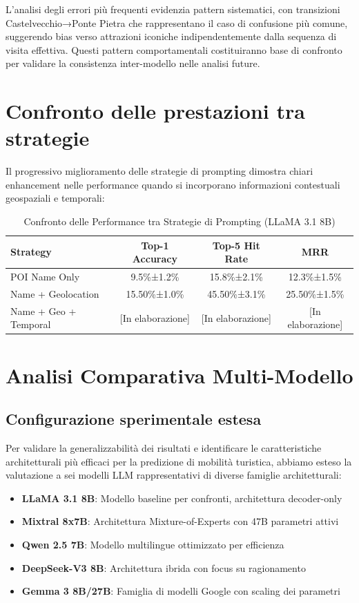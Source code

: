 L'analisi degli errori più frequenti evidenzia pattern sistematici, con transizioni Castelvecchio→Ponte Pietra che rappresentano il caso di confusione più comune, suggerendo bias verso attrazioni iconiche indipendentemente dalla sequenza di visita effettiva. Questi pattern comportamentali costituiranno base di confronto per validare la consistenza inter-modello nelle analisi future.

\section{Confronto delle prestazioni tra strategie}

Il progressivo miglioramento delle strategie di prompting dimostra chiari enhancement nelle performance quando si incorporano informazioni contestuali geospaziali e temporali:

\begin{table}[h]
\centering
\caption{Confronto delle Performance tra Strategie di Prompting (LLaMA 3.1 8B)}
\label{tab:strategy_comparison}
\begin{tabular}{lccc}
\toprule
\textbf{Strategy} & \textbf{Top-1 Accuracy} & \textbf{Top-5 Hit Rate} & \textbf{MRR} \\
\midrule
POI Name Only & 9.5\%±1.2\% & 15.8\%±2.1\% & 12.3\%±1.5\% \\
Name + Geolocation & 15.50\%±1.0\% & 45.50\%±3.1\% & 25.50\%±1.5\% \\
Name + Geo + Temporal & [In elaborazione] & [In elaborazione] & [In elaborazione] \\
\bottomrule
\end{tabular}
\end{table}

\section{Analisi Comparativa Multi-Modello}

\subsection{Configurazione sperimentale estesa}

Per validare la generalizzabilità dei risultati e identificare le caratteristiche architetturali pi\`u efficaci per la predizione di mobilità turistica, abbiamo esteso la valutazione a sei modelli LLM rappresentativi di diverse famiglie architetturali:

\begin{itemize}
\item \textbf{LLaMA 3.1 8B}: Modello baseline per confronti, architettura decoder-only
\item \textbf{Mixtral 8x7B}: Architettura Mixture-of-Experts con 47B parametri attivi
\item \textbf{Qwen 2.5 7B}: Modello multilingue ottimizzato per efficienza
\item \textbf{DeepSeek-V3 8B}: Architettura ibrida con focus su ragionamento
\item \textbf{Gemma 3 8B/27B}: Famiglia di modelli Google con scaling dei parametri
\end{itemize}

